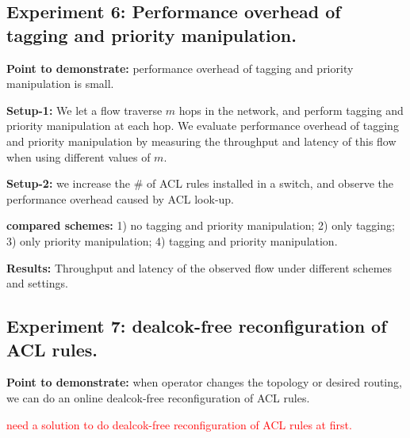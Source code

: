   \subsection{Experiment 6: Performance overhead of tagging and priority manipulation.}\label{subsec:exp_acloverhead}
  
  \textbf{Point to demonstrate:} performance overhead of tagging and priority manipulation is small.
  
  \textbf{Setup-1:} We let a flow traverse $m$ hops in the network, and perform tagging and priority manipulation at each hop. We evaluate performance overhead of tagging and priority manipulation by measuring the throughput and latency of this flow when using different values of $m$.
  
  \textbf{Setup-2:} we increase the $\#$ of ACL rules installed in a switch, and observe the performance overhead caused by ACL look-up.
  
  \textbf{compared schemes:} 1) no tagging and priority manipulation; 2) only tagging; 3) only priority manipulation; 4) tagging and priority manipulation.
  
 \textbf{Results:} Throughput and latency of the observed flow under different schemes and settings.
 
   \subsection{Experiment 7: dealcok-free reconfiguration of ACL rules.}\label{subsec:exp_acloverhead}
   
   \textbf{Point to demonstrate:} when operator changes the topology or desired routing, we can do an online dealcok-free reconfiguration of ACL rules.
   
    \textcolor{red}{need a solution to do dealcok-free reconfiguration of ACL rules at first.}
  